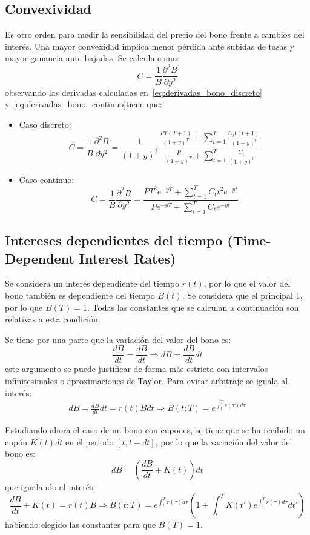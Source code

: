 \subsection{Convexividad}
Es otro orden para medir la sensibilidad del precio del bono frente a cambios del interés. Una mayor convexidad implica menor pérdida ante subidas de tasas y mayor ganancia ante bajadas. Se calcula como:
\[
    \boxed{C = \frac{1}{B}\frac{\partial^2 B}{\partial y^2}}
\]
observando las derivadas calculadas en~\eqref{eq:derivadas_bono_discreto} y~\eqref{eq:derivadas_bono_continuo}tiene que:
\begin{itemize}
    \item Caso discreto:
    \[
        C = \frac{1}{B}\frac{\partial^2 B}{\partial y^2} = \boxed{ \frac{1}{(1+y)^2} \frac{ \frac{P T (T+1)}{(1+y)^{T}} + \sum_{t=1}^{T} \frac{C_t t (t+1)}{(1+y)^{t}} }{ \frac{P}{(1+y)^T} + \sum_{t=1}^{T} \frac{C_t}{(1+y)^t}}  }
    \]
    \item Caso continuo:
    \[
        C = \frac{1}{B}\frac{\partial^2 B}{\partial y^2} = \boxed{ \frac{P T^2 e^{-yT} + \sum_{t=1}^{T} C_t t^2 e^{-yt}}{P e^{-yT} + \sum_{t=1}^{T} C_t e^{-yt}} }
    \]
\end{itemize}






\subsection{Intereses dependientes del tiempo (Time-Dependent Interest Rates)}
Se considera un interés dependiente del tiempo $r(t)$, por lo que el valor del bono también es dependiente del tiempo $B(t)$. Se considera que el principal 1, por lo que $B(T)=1$. Todas las constantes que se calculan a continuación son relativas a esta condición.

Se tiene por una parte que la variación del valor del bono es:
\[
    \frac{dB}{dt} = \frac{dB}{dt} \Rightarrow dB = \frac{dB}{dt} dt
\]
este argumento se puede justificar de forma más estricta con intervalos infinitesimales o aproximaciones de Taylor. Para evitar arbitraje se iguala al interés:
\begin{align}\label{eq:interes_dependiente_tiempo}
    dB = \frac{dB}{dt} dt = r(t) B dt \Rightarrow B(t; T) = e^{\int_{t}^{T} r(\tau) d\tau}
\end{align}

Estudiando ahora el caso de un bono con cupones, se tiene que se ha recibido un cupón $K(t)dt$ en el periodo $[t, t+dt]$, por lo que la variación del valor del bono es:
\[
    dB = \left( \frac{dB}{dt} + K(t) \right) dt
\]
que igualando al interés:
\[
    \frac{dB}{dt} + K(t) = r(t) B \Rightarrow \boxed{B(t; T) = e^{\int_{t}^{T} r(\tau) d\tau} \left( 1 + \int_t^T K(t') e^{\int_{t}^{T} r(\tau) d\tau} dt' \right)}
\] 
habiendo elegido las constantes para que $B(T)=1$.







